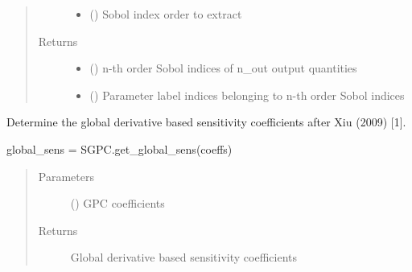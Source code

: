 \documentclass[letterpaper,10pt,english,openany,oneside]{sphinxmanual}
\begin{document}
\begin{fulllineitems}
\begin{fulllineitems}
\begin{quote}
\begin{description}
\begin{itemize}
\item {} 
 (\sphinxstyleliteralemphasis{\sphinxupquote{, }}\sphinxstyleliteralemphasis{\sphinxupquote{, }}) \textendash{} Sobol index order to extract

\end{itemize}

\item[{Returns}] \leavevmode
\begin{itemize}
\item {} 
 () \textendash{} n-th order Sobol indices of n\_out output quantities

\item {} 
 () \textendash{} Parameter label indices belonging to n-th order Sobol indices

\end{itemize}


\end{description}\end{quote}

\end{fulllineitems}


\begin{fulllineitems}
\label{\detokenize{pygpc:pygpc.SGPC.SGPC.get_global_sens}}
Determine the global derivative based sensitivity coefficients after Xiu (2009) {[}1{]}.

global\_sens = SGPC.get\_global\_sens(coeffs)
\begin{quote}\begin{description}
\item[{Parameters}] \leavevmode
{} (\sphinxstyleliteralemphasis{\sphinxupquote{ {[}}}\sphinxstyleliteralemphasis{\sphinxupquote{{]}}}) \textendash{} GPC coefficients

\item[{Returns}] \leavevmode
{} \textendash{} Global derivative based sensitivity coefficients


\end{description}
\end{quote}
\end{fulllineitems}
\end{fulllineitems}
\end{document}
